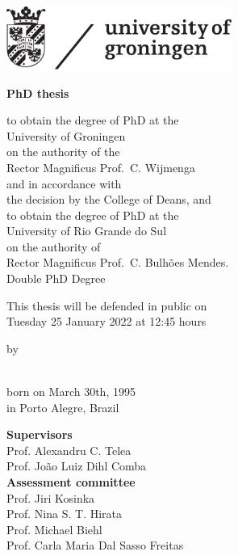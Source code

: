 \thispagestyle{empty}

\begin{addmargin}[-1cm]{-3cm}
\includegraphics[width=7.38cm]{figures/rugr_logoen_zwart_cmyk}

\begin{center}

\large 

\vfill\vfill\vfill\vfill\vfill

{\LARGE\textbf{\myTitle}}

\vfill\vfill\vfill\vfill\vfill

{\Large\textbf{PhD thesis}}

\vfill\vfill\vfill\vfill

to obtain the degree of PhD at the\\
University of Groningen\\
on the authority of the\\
Rector Magnificus Prof.\ C. Wijmenga\\
and in accordance with\\
the decision by the College of Deans,
and\\
to obtain the degree of PhD at the\\
University of Rio Grande do Sul\\
on the authority of\\
Rector Magnificus Prof.\ C. Bulhões Mendes.\\
\vfill
Double PhD Degree\\
\vfill

This thesis will be defended in public on\\

\vfill
Tuesday 25 January 2022 at 12:45 hours\\
\vfill\vfill\vfill\vfill

by

\vfill\vfill\vfill\vfill

{\Large\textbf{\myName}}\\

\vfill
born on March 30th, 1995\\
in Porto Alegre, Brazil 
\end{center}
\end{addmargin}

\newpage
\thispagestyle{empty}
{\large
\noindent\textbf{Supervisors}\\
Prof. Alexandru C. Telea\\
Prof. João Luiz Dihl Comba\\

\noindent\textbf{Assessment committee}\\
Prof. Jiri Kosinka\\
Prof. Nina S. T. Hirata\\
Prof. Michael Biehl\\
Prof. Carla Maria Dal Sasso Freitas\\

\vfill
}
